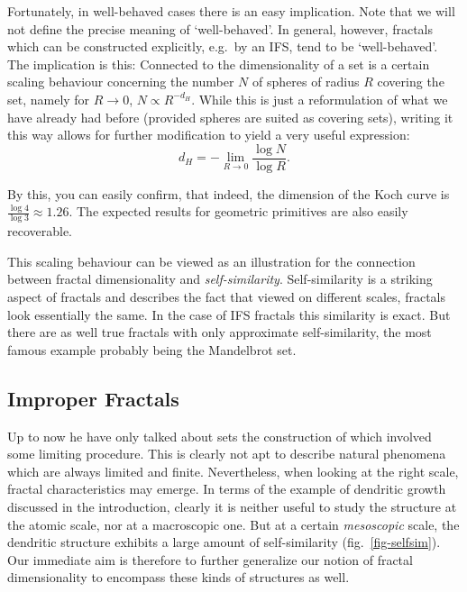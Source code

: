 \documentclass[twocolumn,10pt]{scrartcl}
\begin{document}
            Fortunately, in well-behaved cases there is an easy implication. Note that we will not define the precise
            meaning of `well-behaved'. In general, however, fractals which can be constructed explicitly, e.g.\ by
            an IFS, tend to be `well-behaved'. The implication is this: Connected to the dimensionality of a set
            is a certain scaling behaviour concerning the number $N$ of spheres of radius $R$ covering the set, namely
            for $R\rightarrow 0$, $N\propto R^{-d_H}$. While this is just a reformulation of what we have already had
            before (provided spheres are suited as covering sets), writing it this way allows for further modification
            to yield a very useful expression:
            \begin{equation}
                d_H=-\lim_{R\rightarrow 0}\frac{\log N}{\log R}.
                \label{eq-bcdimlim}
            \end{equation}

            By this, you can easily confirm, that indeed, the dimension of the Koch curve is
            $\frac{\log{4}}{\log{3}}\approx 1.26$. The expected results for geometric primitives are also easily
            recoverable.

            This scaling behaviour can be viewed as an illustration for the connection between fractal dimensionality
            and \emph{self-similarity}. Self-similarity is a striking aspect of fractals and describes the fact that
            viewed on different scales, fractals look essentially the same. In the case of IFS fractals this similarity
            is exact. But there are as well true fractals with only approximate self-similarity, the most famous
            example probably being the Mandelbrot set.

        \subsection{Improper Fractals}
            Up to now he have only talked about sets the construction of which involved some limiting procedure. This
            is clearly not apt to describe natural phenomena which are always limited and finite. Nevertheless, when
            looking at the right scale, fractal characteristics may emerge. In terms of the example of dendritic growth
            discussed in the introduction, clearly it is neither useful to study the structure at the atomic scale,
            nor at a macroscopic one. But at a certain \emph{mesoscopic} scale, the dendritic structure exhibits a large
            amount of self-similarity (fig.~\ref{fig-selfsim}). Our immediate aim is therefore to further generalize
            our notion of fractal dimensionality to encompass these kinds of structures as well.
            
\end{document}
